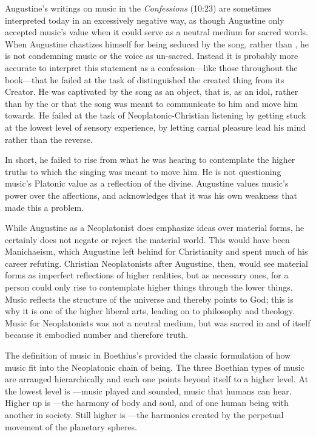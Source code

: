 Augustine's writings on music in the \emph{Confessions} (10:23) are sometimes interpreted today in an excessively negative way, as though Augustine only accepted music's value when it could serve as a neutral medium for sacred words.
When Augustine chastizes himself for being seduced by the song, rather than , he is not condemning music or the voice as un-sacred.
Instead it is probably more accurate to interpret this statement as a confession---like those throughout the book---that he failed at the task of distinguished the created thing from its Creator.
He was captivated by the song as an object, that is, as an idol, rather than by the  or  that the song was meant to communicate to him and move him towards. 
He failed at the task of Neoplatonic-Christian listening by getting stuck at the lowest level of sensory experience, by letting carnal pleasure lead his mind rather than the reverse.

In short, he failed to rise from what he was hearing to contemplate the higher truths to which the singing was meant to move him.
He is not questioning music's Platonic value as a reflection of the divine.
Augustine values music's power over the affections, and acknowledges that it was his own weakness that made this a problem.  

While Augustine as a Neoplatonist does emphasize ideas over material forms, he certainly does not negate or reject the material world.
This would have been Manichaeism, which Augustine left behind for Christianity and spent much of his career refuting.
Christian Neoplatonists after Augustine, then, would see material forms as imperfect reflections of higher realities, but as necessary ones, for a person could only rise to contemplate higher things through the lower things.
Music reflects the structure of the universe and thereby points to God; this is why it is one of the higher liberal arts, leading on to philosophy and theology.
Music for Neoplatonists was not a neutral medium, but was sacred in and of itself because it embodied number and therefore truth.

The definition of music in Boethius's  provided the classic formulation of how music fit into the Neoplatonic chain of being.%
The three Boethian types of music are arranged hierarchically and each one points beyond itself to a higher level.
At the lowest level is ---music played and sounded, music that humans can hear.
Higher up is ---the harmony of body and soul, and of one human being with another in society.
Still higher is ---the harmonies created by the perpetual movement of the planetary spheres.

